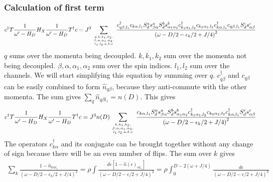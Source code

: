 \subsubsection{Calculation of first term}
\begin{equation}\begin{aligned}
	c^\dagger T \frac{1}{\omega^\prime - H_D} H_X \frac{1}{\omega^\prime - H_D} T^\dagger c = J^3\sum_{q, k, k_1,k_2,\atop{\beta, \alpha, \alpha_1,\alpha_2,\atop{l_1,l_2,a,b,c}}} \frac{c^\dagger_{q\beta,l_1} c_{k\alpha,l_1} S_d^a s^a_{\beta \alpha} S_d^b s^b_{\alpha_1 \alpha_2} c^\dagger_{k_1\alpha_1,l_2}c_{k_2 \alpha_2,l_2} c^\dagger_{k\alpha, l_1} c_{q\beta, l_1} S_d^c s^c_{\alpha \beta}}{\left(\omega - D/2 -\epsilon_k/2 + J/4\right)^2}
\end{aligned}\end{equation}
\(q\) sums over the momenta being decoupled. \(k, k_1,k_2\) sum over the momenta not being decoupled. \(\beta, \alpha, \alpha_1,\alpha_2\) sum over the spin indices. \(l_1,l_2\) sum over the channels. We will start simplifying this equation by summing over \(q\). \(c^\dagger_{q\beta}\) and \(c_{q\beta}\) can be easily combined to form \(\hat n_{q\beta}\), because they anti-commute with the other momenta. The sum gives \(\sum_q \hat n_{q\beta l_1} = n(D) \). This gives
\begin{equation}\begin{aligned}
	c^\dagger T \frac{1}{\omega^\prime - H_D} H_X \frac{1}{\omega^\prime - H_D} T^\dagger c = J^3 n(D)\sum_{k, k_1,k_2,\atop{\beta, \alpha, \alpha_1,\alpha_2,\atop{l_1,l_2,a,b,c}}} \frac{c_{k\alpha,l_1} S_d^a s^a_{\beta \alpha} S_d^b s^b_{\alpha_1 \alpha_2} c^\dagger_{k_1\alpha_1,l_2}c_{k_2 \alpha_2,l_2} c^\dagger_{k\alpha, l_1} S_d^c s^c_{\alpha \beta}}{\left(\omega - D/2 -\epsilon_k/2 + J/4\right)^2}
\end{aligned}\end{equation}
The operators \(c^\dagger_{k\alpha}\) and its conjugate can be brought together without any change of sign because there will be an even number of flips. The sum over \(k\) gives
\begin{equation}\begin{aligned}
	\sum_k \frac{1 - \hat n_{k\alpha l_1}}{\left(\omega - D/2 -\epsilon_k/2 + J/4\right)^2} =  \rho\int \frac{d\epsilon\left[1 - \hat n(\epsilon)_{\alpha l_1}\right] }{\left(\omega - D/2 -\epsilon/2 + J/4\right)^2} = \rho\int_0^{D-2\left( \omega + J/4 \right) } \frac{d\epsilon}{\left(\omega - D/2 -\epsilon/2 + J/4\right)^2}
\end{aligned}\end{equation}

